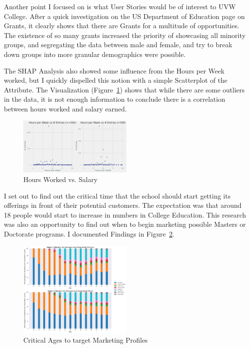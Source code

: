 \documentclass{IEEEtran}
\begin{document}
Another point I focused on is what User Stories would be of interest to UVW College. After a quick investigation on the US Department of Education page on Grants, it clearly shows that there are Grants for a multitude of opportunities\cite{grants}. The existence of so many grants increased the priority of showcasing all minority groups, and segregating the data between male and female, and try to break down groups into more granular demographics were possible.

The SHAP Analysis also showed some influence from the Hours per Week worked, but I quickly dispelled this notion with a simple Scatterplot of the Attribute. The Visualization (Figure~\ref{fig:hoursWorkedVsSalary}) shows that while there are some outliers in the data, it is not enough information to conclude there is a correlation between hours worked and salary earned.

\begin{figure}[!t]
  \centering
  \captionsetup{justification=centering}
  \includegraphics[width=0.5\textwidth]{hoursWorkedVsSalary.png}%
  \caption{Hours Worked vs. Salary}%
  \label{fig:hoursWorkedVsSalary}%
\end{figure}


I set out to find out the critical time that the school should start getting its offerings in front of their potential customers. The expectation was that around 18 people would start to increase in numbers in College Education. This research was also an opportunity to find out when to begin marketing possible Masters or Doctorate programs. I documented Findings in Figure~\ref{fig:criticalAgeTarget}.

\begin{figure}[!t]
  \centering
  \captionsetup{justification=centering}
  \includegraphics[width=0.5\textwidth]{criticalAgeTarget.png}%
  \caption{Critical Ages to target Marketing Profiles}%
  \label{fig:criticalAgeTarget}%
\end{figure}
\end{document}

